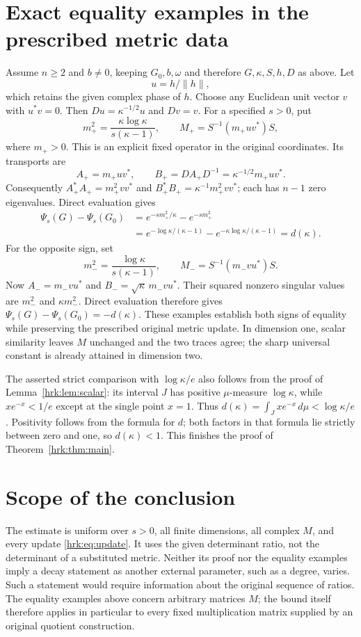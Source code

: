 \documentclass[11pt]{article}
\begin{document}
\section{Exact equality examples in the prescribed metric data}
Assume $n\geq2$ and $b\ne0$, keeping $G_0,b,\omega$ and therefore
$G,\kappa,S,h,D$ as above. Let
\[
 u=h/\|h\|,
\]
which retains the given complex phase of $h$. Choose any Euclidean
unit vector $v$ with $u^*v=0$. Then
$Du=\kappa^{-1/2}u$ and $Dv=v$.
For a specified $s>0$, put
\begin{equation}\label{hrk:eq:positive-example}
 m_+^2=\frac{\kappa\log\kappa}{s(\kappa-1)},\qquad
 M_+=S^{-1}(m_+uv^*)S,
\end{equation}
where $m_+>0$. This is an explicit fixed operator in the original
coordinates. Its transports are
\[
 A_+=m_+uv^*,\qquad B_+=D A_+ D^{-1}
             =\kappa^{-1/2}m_+uv^*.
\]
Consequently $A_+^*A_+=m_+^2vv^*$ and
$B_+^*B_+=\kappa^{-1}m_+^2vv^*$; each has $n-1$ zero
eigenvalues. Direct evaluation gives
\begin{align*}
 \Psi_s(G)-\Psi_s(G_0)
 &= e^{-sm_+^2/\kappa}-e^{-sm_+^2}\\
 &=e^{-\log\kappa/(\kappa-1)}
     -e^{-\kappa\log\kappa/(\kappa-1)}
 =d(\kappa).
\end{align*}
For the opposite sign, set
\begin{equation}\label{hrk:eq:negative-example}
 m_-^2=\frac{\log\kappa}{s(\kappa-1)},\qquad
 M_-=S^{-1}(m_-vu^*)S.
\end{equation}
Now $A_-=m_-vu^*$ and $B_-=\sqrt\kappa\,m_-vu^*$.
Their squared nonzero singular values are $m_-^2$ and
$\kappa m_-^2$. Direct evaluation therefore gives
$\Psi_s(G)-\Psi_s(G_0)=-d(\kappa)$.
These examples establish both signs of equality while preserving
the prescribed original metric update. In dimension one, scalar
similarity leaves $M$ unchanged and the two traces agree; the sharp
universal constant is already attained in dimension two.

The asserted strict comparison with $\log\kappa/e$ also follows
from the proof of Lemma~\ref{hrk:lem:scalar}: its interval $J$ has
positive $\mu$-measure $\log\kappa$, while $xe^{-x}<1/e$ except
at the single point $x=1$. Thus
$d(\kappa)=\int_J xe^{-x}\,d\mu<\log\kappa/e$.
Positivity follows from the formula for $d$; both factors in that
formula lie strictly between zero and one, so $d(\kappa)<1$.
This finishes the proof of Theorem~\ref{hrk:thm:main}.

\section{Scope of the conclusion}
The estimate is uniform over $s>0$, all finite dimensions, all
complex $M$, and every update \eqref{hrk:eq:update}. It uses the given
determinant ratio, not the determinant of a substituted metric.
Neither its proof nor the equality examples imply a decay statement
as another external parameter, such as a degree, varies. Such a
statement would require information about the original sequence of
ratios. The equality examples above concern arbitrary matrices $M$;
the bound itself therefore applies in particular to every fixed
multiplication matrix supplied by an original quotient construction.
\end{document}
